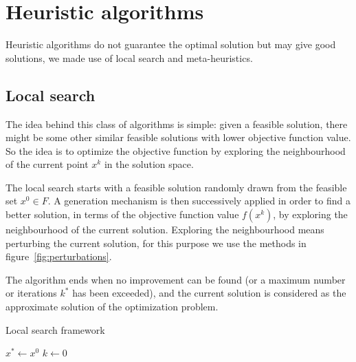 \section{Heuristic algorithms}\label{sc:algs}

Heuristic algorithms do not guarantee the optimal solution but may give good solutions, we made use of local search and meta-heuristics.

\subsection{Local search}\label{subsc:local-search}

The idea behind this class of algorithms is simple: given a feasible solution, there might be some other similar feasible solutions with lower objective function value. So the idea is to optimize the objective function by exploring the neighbourhood of the current point $x^k$ in the solution space.

The local search starts with a feasible solution randomly drawn from the feasible set $x^0\in F$. A generation mechanism is then successively applied in order to find a better solution, in terms of the objective function value $f(x^k)$, by exploring the neighbourhood of the current solution. Exploring the neighbourhood means perturbing the current solution, for this purpose we use the methods in figure~\vref{fig:perturbations}.

The algorithm ends when no improvement can be found (or a maximum number or iterations $k^\ast$ has been exceeded), and the current solution is considered as the approximate solution of the optimization problem.


\begin{algorithm}\caption{Local search framework}\label{alg:local-search}
	$x^\ast\gets x^0$\;
	$k\gets 0$\;
\end{algorithm}


